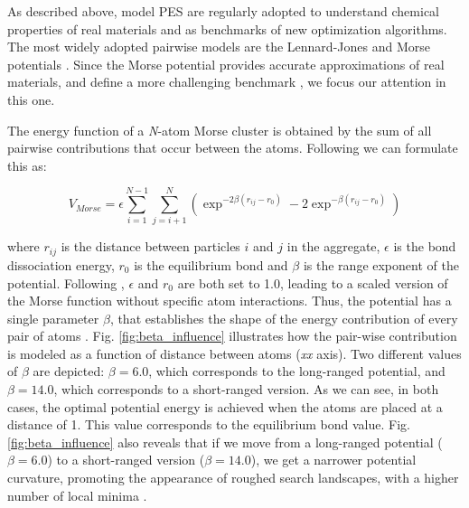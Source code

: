 	As described above, model PES are regularly adopted to understand chemical properties of real materials and as benchmarks of new optimization algorithms. The most widely adopted pairwise models are the Lennard-Jones \cite{lennardJones31} and Morse potentials \cite{morse29}. Since the Morse potential provides accurate approximations of real materials, and define a more challenging benchmark \cite{braier90, smirnov99}, we focus our attention in this one.

	The energy function of a \emph{N}-atom Morse cluster is obtained by the sum of all pairwise contributions that occur between the atoms. Following \cite{doye97, morse29} we can formulate this as:
	
	\begin{equation} 
		\label{eq:morse_potential}
		V_{Morse} = \epsilon \sum_{i=1}^{N-1}\sum_{j=i+1}^{N} \left ( \exp^{-2\beta(r_{ij}-r_{0})} - 2\exp^{-\beta(r_{ij}-r_{0})} \right)
	\end{equation}


	\noindent where $r_{ij}$ is the distance between particles $i$ and $j$ in the aggregate, $\epsilon$ is the bond dissociation energy, $r_{0}$ is the equilibrium bond and $\beta$ is the range exponent of the potential. Following \cite{doye97}, $\epsilon$ and $r_{0}$ are both set to 1.0, leading to a scaled version of the Morse function without specific atom interactions. Thus, the potential has a single parameter $\beta$, that establishes the shape of the energy contribution of every pair of atoms \cite{doye04}. Fig. \ref{fig:beta_influence} illustrates how the pair-wise contribution is modeled as a function of distance between atoms (\emph{xx} axis). Two different values of $\beta$ are depicted: $\beta = 6.0$, which corresponds to the long-ranged potential, and $\beta = 14.0$, which corresponds to a short-ranged version. As we can see, in both cases, the optimal potential energy is achieved when the atoms are placed at a distance of 1. This value corresponds to the equilibrium bond value. Fig.\ref{fig:beta_influence} also reveals that if we move from a long-ranged potential ($\beta = 6.0$) to a short-ranged version ($\beta = 14.0$), we get a narrower potential curvature, promoting the appearance of roughed search landscapes, with a higher number of local minima \cite{doye04}.
	
	
	
	
	
	
	
	
	
